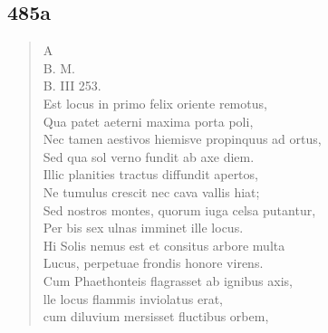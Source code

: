 \documentclass[11pt, a4paper]{report}
\begin{document}
            \subsection*{485a}
      \begin{verse}
      A \\ B. M. \\ B. III 253. \\ Est locus in primo felix oriente remotus, \\ Qua patet aeterni maxima porta poli, \\ Nec tamen aestivos hiemisve propinquus ad ortus, \\ Sed qua sol verno fundit ab axe diem. \\ Illic planities tractus diffundit apertos, \\ Ne tumulus crescit nec cava vallis hiat; \\ Sed nostros montes, quorum iuga celsa putantur, \\ Per bis sex ulnas imminet ille locus. \\ Hi Solis nemus est et consitus arbore multa \\ Lucus, perpetuae frondis honore virens. \\ Cum Phaethonteis flagrasset ab ignibus axis, \\ lle locus flammis inviolatus erat, \\ cum diluvium mersisset fluctibus orbem, \\ 
      \end{verse}
  
\end{document}
